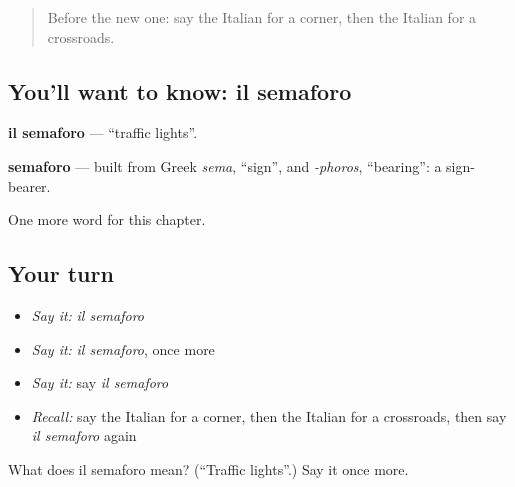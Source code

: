 \begin{quote}
Before the new one: say the Italian for a corner, then the Italian for a crossroads.
\end{quote}

\subsection*{You'll want to know: il semaforo}
\textbf{il semaforo} — \textquotedblleft{}traffic lights\textquotedblright{}.

\begin{cousinweb}
\textbf{semaforo} — built from Greek \emph{sema}, \textquotedblleft{}sign\textquotedblright{}, and \emph{-phoros}, \textquotedblleft{}bearing\textquotedblright{}: a sign-bearer.
\end{cousinweb}

\begin{grammarlens}[title={What you've built}]
One more word for this chapter.
\end{grammarlens}

\subsection*{Your turn}
\begin{itemize}
\raggedright
  \item \emph{Say it:} \emph{il semaforo}
  \item \emph{Say it:} \emph{il semaforo}, once more
  \item \emph{Say it:} say \emph{il semaforo}
  \item \emph{Recall:} say the Italian for a corner, then the Italian for a crossroads, then say \emph{il semaforo} again
\end{itemize}

\begin{tcolorbox}[breakable,colback=teal!4,colframe=teal!35!black,title={Before you move on}]
What does il semaforo mean? (\textquotedblleft{}Traffic lights\textquotedblright{}.) Say it once more.
\end{tcolorbox}
